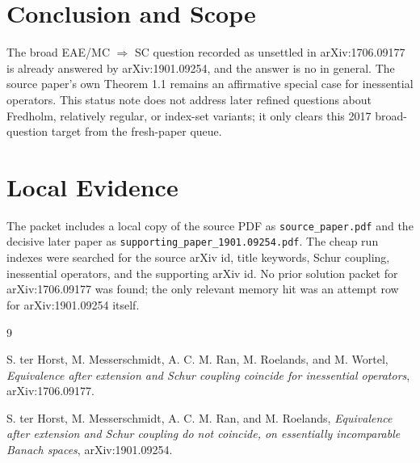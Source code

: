 \documentclass[11pt]{article}
\begin{document}
\section*{Conclusion and Scope}

The broad EAE/MC $\Rightarrow$ SC question recorded as unsettled in
arXiv:1706.09177 is already answered by arXiv:1901.09254, and the answer is
no in general. The source paper's own Theorem 1.1 remains an affirmative
special case for inessential operators. This status note does not address
later refined questions about Fredholm, relatively regular, or index-set
variants; it only clears this 2017 broad-question target from the fresh-paper
queue.

\section*{Local Evidence}

The packet includes a local copy of the source PDF as \texttt{source\_paper.pdf}
and the decisive later paper as \texttt{supporting\_paper\_1901.09254.pdf}.
The cheap run indexes were searched for the source arXiv id, title keywords,
Schur coupling, inessential operators, and the supporting arXiv id. No prior
solution packet for arXiv:1706.09177 was found; the only relevant memory hit
was an attempt row for arXiv:1901.09254 itself.

\begin{thebibliography}{9}

S. ter Horst, M. Messerschmidt, A. C. M. Ran, M. Roelands, and M. Wortel,
\emph{Equivalence after extension and Schur coupling coincide for inessential
operators}, arXiv:1706.09177.

S. ter Horst, M. Messerschmidt, A. C. M. Ran, and M. Roelands,
\emph{Equivalence after extension and Schur coupling do not coincide, on
essentially incomparable Banach spaces}, arXiv:1901.09254.

\end{thebibliography}
\end{document}
